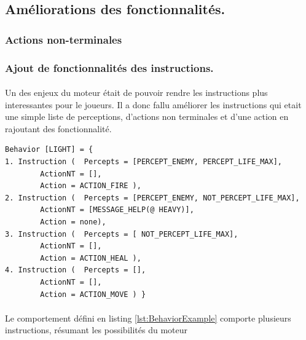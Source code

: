 \documentclass{report}
\begin{document}
\subsection{Améliorations des fonctionnalités.}

\subsubsection{Actions non-terminales}

\subsubsection{Ajout de fonctionnalités des instructions.}
\paragraph{}Un des enjeux du moteur était de pouvoir rendre les instructions plus interessantes pour le joueurs. Il a donc fallu améliorer les instructions qui etait une simple liste de perceptions, d'actions non terminales et d'une action en rajoutant des fonctionnalité.\newline
\begin{lstlisting}[label={lst:BehaviorExample}, caption=  Exemple d'un comportement que peut renvoyer l’interpréteur.]
Behavior [LIGHT] = {
1. Instruction (  Percepts = [PERCEPT_ENEMY, PERCEPT_LIFE_MAX],
		ActionNT = [],
		Action = ACTION_FIRE ),
2. Instruction (  Percepts = [PERCEPT_ENEMY, NOT_PERCEPT_LIFE_MAX],
		ActionNT = [MESSAGE_HELP(@ HEAVY)],
		Action = none),
3. Instruction (  Percepts = [ NOT_PERCEPT_LIFE_MAX],
		ActionNT = [],
		Action = ACTION_HEAL ),
4. Instruction (  Percepts = [],
		ActionNT = [],
		Action = ACTION_MOVE ) }
\end{lstlisting}


\paragraph{}Le comportement défini en listing \ref{lst:BehaviorExample} comporte plusieurs instructions, résumant les possibilités du moteur
\end{document}
